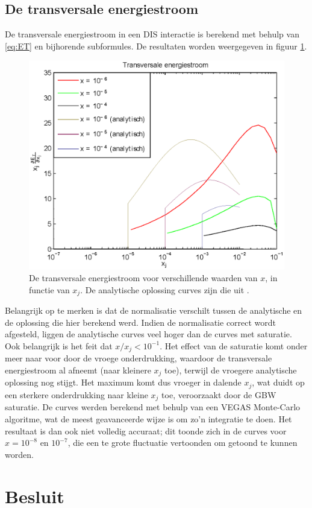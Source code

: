\documentclass[a4paper,11pt]{article}
\numberwithin{equation}{section} %
\begin{document}
  \subsection{De transversale energiestroom} \label{sec:ResET}
De transversale energiestroom in een DIS interactie is berekend met behulp van \eqref{eq:ET} en bijhorende subformules.
De resultaten worden weergegeven in figuur \ref{fig:ResET}.
\begin{figure} [H]
  \begin{center}
    \includegraphics[width=.66\textwidth]{Afbeeldingen/ET.eps}
    \caption{De transversale energiestroom voor verschillende waarden van $x$, in functie van $x_j$. De analytische oplossing curves zijn die uit \cite[sec. IV]{ET}. }
   \label{fig:ResET}
  \end{center}
\end{figure}
Belangrijk op te merken is dat de normalisatie verschilt tussen de analytische en de oplossing die hier berekend werd.
Indien de normalisatie correct wordt afgesteld, liggen de analytische curves veel hoger dan de curves met saturatie.
Ook belangrijk is het feit dat $x/x_j < 10^{-1}$.
Het effect van de saturatie komt onder meer naar voor door de vroege onderdrukking, waardoor de transversale energiestroom al afneemt (naar kleinere $x_j$ toe), terwijl de vroegere analytische oplossing nog stijgt.
Het maximum komt dus vroeger in dalende $x_j$, wat duidt op een sterkere onderdrukking naar kleine $x_j$ toe, veroorzaakt door de GBW saturatie.
De curves werden berekend met behulp van een VEGAS Monte-Carlo algoritme, wat de meest geavanceerde wijze is om zo’n integratie te doen.
Het resultaat is dan ook niet volledig accuraat; dit toonde zich in de curves voor $x=10^{-8}$ en $10^{-7}$, die een te grote fluctuatie vertoonden om getoond te kunnen worden.

\section{Besluit}
\end{document}
